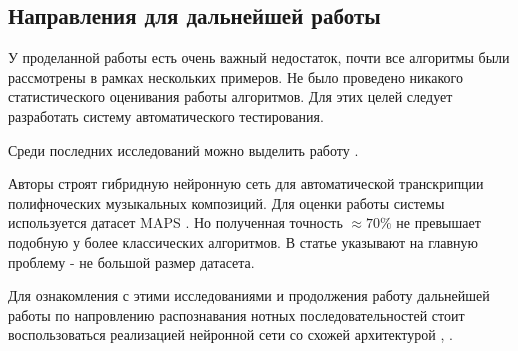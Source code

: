 \subsection{Направления для дальнейшей работы}

У проделанной работы есть очень важный недостаток, почти
все алгоритмы были рассмотрены в рамках нескольких примеров.
Не было проведено никакого статистического оценивания работы
алгоритмов. Для этих целей следует разработать систему автоматического
тестирования.

Среди последних исследований можно выделить работу \cite{SBETENN}.

Авторы строят гибридную нейронную сеть для автоматической транскрипции
полифноческих музыкальных композиций. Для оценки работы системы
используется датасет MAPS \cite{L:MAPS}. Но полученная точность $\approx 70\%$
не превышает подобную у более классических алгоритмов.
В статье указывают на главную проблему - не большой размер датасета.

Для ознакомления с этими исследованиями и продолжения работу дальнейшей работы
по напровлению распознавания нотных последовательностей стоит воспользоваться
реализацией нейронной сети со схожей архитектурой
\cite{KCFGAMT}, \cite{L:auto-music-tagger}.

